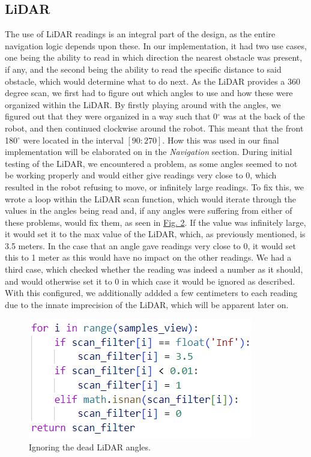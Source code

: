 \documentclass[conference]{IEEEtran}
\begin{document}
\subsection{LiDAR}
The use of LiDAR readings is an integral part of the design, as the entire navigation logic depends upon these.
In our implementation, it had two use cases, one being the ability to read in which direction the nearest obstacle was present, if any, and the second being the ability to read the specific distance to said obstacle, which would determine what to do next.
As the LiDAR provides a 360 degree scan, we first had to figure out which angles to use and how these were organized within the LiDAR.
By firstly playing around with the angles, we figured out that they were organized in a way such that 0$^\circ$ was at the back of the robot, and then continued clockwise around the robot.
This meant that the front 180$^\circ$ were located in the interval $[90:270]$. How this was used in our final implementation will be elaborated on in the \textit{Navigation} section.
During initial testing of the LiDAR, we encountered a problem, as some angles seemed to not be working properly and would either give readings very close to 0, which resulted in the robot refusing to move, or infinitely large readings.
To fix this, we wrote a loop within the LiDAR scan function, which would iterate through the values in the angles being read and, if any angles were suffering from either of these problems, would fix them, as seen in \href{sec:lidar}{Fig. 2}.
If the value was infinitely large, it would set it to the max value of the LiDAR, which, as previously mentioned, is 3.5 meters.
In the case that an angle gave readings very close to 0, it would set this to 1 meter as this would have no impact on the other readings.
We had a third case, which checked whether the reading was indeed a number as it should, and would otherwise set it to 0 in which case it would be ignored as described.
With this configured, we additionally addded a few centimeters to each reading due to the innate imprecision of the LiDAR, which will be apparent later on.
\begin{figure}[htbp]
    \centerline{\includegraphics[width=0.6\columnwidth\hspace{-1.3cm}]{LiDARhvid.png}}
    \caption{Ignoring the dead LiDAR angles.}
    \label{sec:lidar}
    \end{figure}
\end{document}
